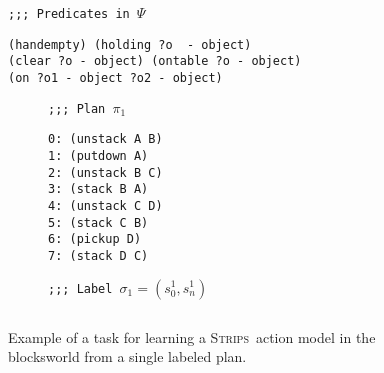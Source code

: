 \documentclass[letterpaper]{article} %
\newcommand{\strips}{\textsc{Strips}}     %
\begin{document}
\begin{figure}
{\tt ;;; Predicates in $\Psi$}
\begin{footnotesize}
\begin{verbatim}
(handempty) (holding ?o  - object)
(clear ?o - object) (ontable ?o - object)
(on ?o1 - object ?o2 - object)
\end{verbatim}
\end{footnotesize}

\vspace{0.2cm}

\begin{subfigure}{.25\textwidth}
{\tt ;;; Plan $\pi_1$}
\begin{footnotesize}
\begin{verbatim}
0: (unstack A B)
1: (putdown A)
2: (unstack B C)
3: (stack B A)
4: (unstack C D)
5: (stack C B)
6: (pickup D)
7: (stack D C)
\end{verbatim}
\end{footnotesize}
\end{subfigure}%
\begin{subfigure}{.6\textwidth}
{\tt ;;; Label $\sigma_1=(s_0^1,s_{n}^1)$}
\begin{lstlisting}[mathescape]
\end{lstlisting}
\vspace{0.1cm}
\vspace{0.6cm}
\end{subfigure}%
 \caption{\small Example of a task for learning a \strips\ action model in the blocksworld from a single labeled plan.}
\label{fig:lexample}
\end{figure}
\end{document}
